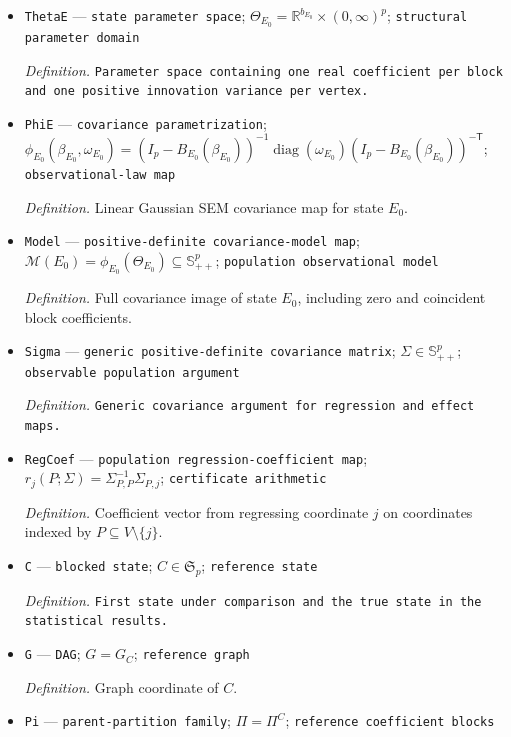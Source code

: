 \documentclass{article}
\begin{document}
\begin{itemize}
  \item \texttt{ThetaE} --- \texttt{state parameter space}; \(\Theta_{E_0}=\mathbb R^{b_{E_0}}\times(0,\infty)^p\); \texttt{structural parameter domain}
  \par\smallskip\noindent\emph{Definition.} \texttt{Parameter space containing one real coefficient per block and one positive innovation variance per vertex.}
  \item \texttt{PhiE} --- \texttt{covariance parametrization}; \(\phi_{E_0}(\beta_{E_0},\omega_{E_0})=(I_p-B_{E_0}(\beta_{E_0}))^{-1}\operatorname{diag}(\omega_{E_0})(I_p-B_{E_0}(\beta_{E_0}))^{-\mathsf T}\); \texttt{observational-\allowbreak{}law map}
  \par\smallskip\noindent\emph{Definition.} Linear Gaussian SEM covariance map for state \(E_0\).
  \item \texttt{Model} --- \texttt{positive-\allowbreak{}definite covariance-\allowbreak{}model map}; \(\mathcal M(E_0)=\phi_{E_0}(\Theta_{E_0})\subseteq\mathbb S^p_{++}\); \texttt{population observational model}
  \par\smallskip\noindent\emph{Definition.} Full covariance image of state \(E_0\), including zero and coincident block coefficients.
  \item \texttt{Sigma} --- \texttt{generic positive-\allowbreak{}definite covariance matrix}; \(\Sigma\in\mathbb S^p_{++}\); \texttt{observable population argument}
  \par\smallskip\noindent\emph{Definition.} \texttt{Generic covariance argument for regression and effect maps.}
  \item \texttt{RegCoef} --- \texttt{population regression-\allowbreak{}coefficient map}; \(r_j(P;\Sigma)=\Sigma_{P,P}^{-1}\Sigma_{P,j}\); \texttt{certificate arithmetic}
  \par\smallskip\noindent\emph{Definition.} Coefficient vector from regressing coordinate \(j\) on coordinates indexed by \(P\subseteq V\setminus\{j\}\).
  \item \texttt{C} --- \texttt{blocked state}; \(C\in\mathfrak S_p\); \texttt{reference state}
  \par\smallskip\noindent\emph{Definition.} \texttt{First state under comparison and the true state in the statistical results.}
  \item \texttt{G} --- \texttt{DAG}; \(G=G_C\); \texttt{reference graph}
  \par\smallskip\noindent\emph{Definition.} Graph coordinate of \(C\).
  \item \texttt{Pi} --- \texttt{parent-\allowbreak{}partition family}; \(\Pi=\Pi^C\); \texttt{reference coefficient blocks}

\end{itemize}
\end{document}
